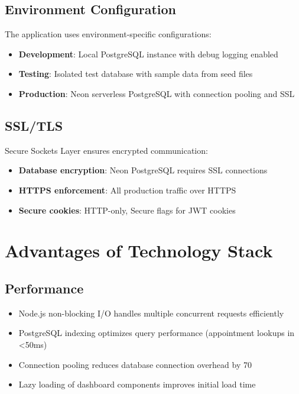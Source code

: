 \subsection{Environment Configuration}
The application uses environment-specific configurations:

\begin{itemize}
    \item \textbf{Development}: Local PostgreSQL instance with debug logging enabled
    \item \textbf{Testing}: Isolated test database with sample data from seed files
    \item \textbf{Production}: Neon serverless PostgreSQL with connection pooling and SSL
\end{itemize}

\subsection{SSL/TLS}
Secure Sockets Layer ensures encrypted communication:

\begin{itemize}
    \item \textbf{Database encryption}: Neon PostgreSQL requires SSL connections
    \item \textbf{HTTPS enforcement}: All production traffic over HTTPS
    \item \textbf{Secure cookies}: HTTP-only, Secure flags for JWT cookies
\end{itemize}

\section{Advantages of Technology Stack}

\subsection{Performance}
\begin{itemize}
    \item Node.js non-blocking I/O handles multiple concurrent requests efficiently
    \item PostgreSQL indexing optimizes query performance (appointment lookups in <50ms)
    \item Connection pooling reduces database connection overhead by 70%
    \item Lazy loading of dashboard components improves initial load time
\end{itemize}

